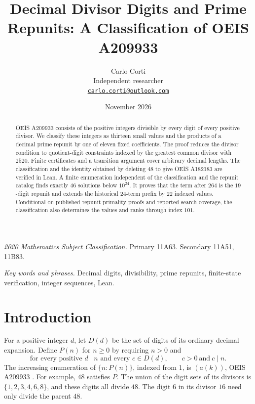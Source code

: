 \documentclass[11pt]{article}
\title{Decimal Divisor Digits and Prime Repunits: A Classification of OEIS A209933}
\author{Carlo Corti\\Independent researcher\\
\href{mailto:carlo.corti@outlook.com}{\texttt{carlo.corti@outlook.com}}}
\date{November 2026}
\begin{document}
\maketitle

\begin{abstract}
OEIS A209933 consists of the positive integers divisible by every digit
of every positive divisor. We classify these integers as thirteen small
values and the products of a decimal prime repunit by one of eleven fixed
coefficients. The proof reduces the divisor condition to quotient-digit
constraints indexed by the greatest common divisor with \(2520\).
Finite certificates and a transition argument cover arbitrary decimal
lengths. The classification and the identity obtained by deleting \(48\)
to give OEIS A182183 are verified in Lean. A finite enumeration independent
of the classification and the repunit catalog finds exactly \(46\) solutions
below \(10^{24}\). It proves that the term after \(264\) is the \(19\)-digit
repunit and extends the historical \(24\)-term prefix by \(22\) indexed
values. Conditional on published repunit primality proofs and reported
search coverage, the classification also determines the values and ranks
through index \(101\).
\end{abstract}

\noindent\textit{2020 Mathematics Subject Classification.}
Primary 11A63. Secondary 11A51, 11B83.

\noindent\textit{Key words and phrases.}
Decimal digits, divisibility, prime repunits, finite-state verification,
integer sequences, Lean.

\section{Introduction}\label{sec:intro}

For a positive integer \(d\), let \(D(d)\) be the set of digits of its
ordinary decimal expansion. Define \(P(n)\) for \(n\ge 0\) by requiring
\(n>0\) and
\[
 \text{for every positive }d\mid n\text{ and every }c\in D(d),
 \qquad c>0\ \text{and}\ c\mid n.
\]
The increasing enumeration of \(\{n:P(n)\}\), indexed from \(1\), is
\((a(k))\), OEIS A209933 \cite{oeis209933}. For example, \(48\) satisfies
\(P\). The union of the digit sets of its divisors is
\(\{1,2,3,4,6,8\}\), and these digits all divide \(48\). The digit \(6\)
in its divisor \(16\) need only divide the parent \(48\).
\end{document}
